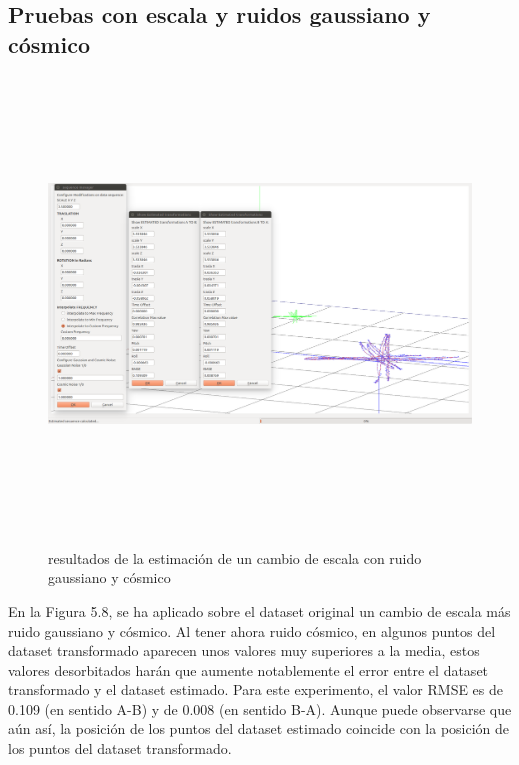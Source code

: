 \subsection{Pruebas con escala y ruidos gaussiano y cósmico}
\begin{figure}[h]
\begin{center}
\label{fig:opciones de View}\includegraphics[height=12.0cm,width=18.0cm]{img/cap6/Escala_GaussCosmicNoise_abba.png}
\hspace{0.5cm}

\end{center}

\caption{resultados de la estimación de un cambio de escala con ruido gaussiano y cósmico}
\end{figure}

En la Figura 5.8, se ha aplicado sobre el dataset original un cambio de escala más ruido gaussiano y cósmico. Al tener ahora ruido cósmico, en algunos puntos del dataset transformado aparecen unos valores muy superiores a la media, estos valores desorbitados harán que aumente notablemente el error entre el dataset transformado y el dataset estimado.
Para este experimento, el valor RMSE es de 0.109 (en sentido A-B) y de 0.008 (en sentido B-A). Aunque puede observarse que aún así, la posición de los puntos del dataset estimado coincide con la posición de los puntos del dataset transformado.



